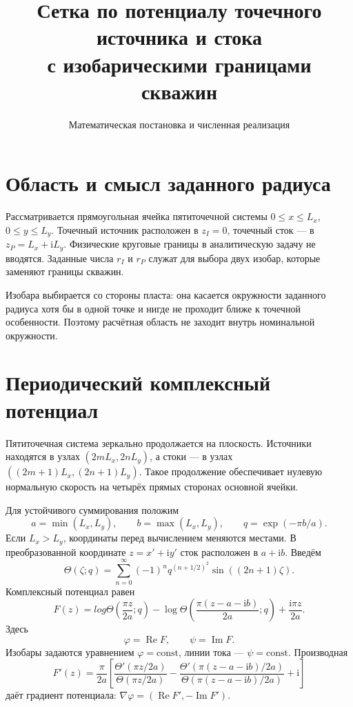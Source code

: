 \documentclass[12pt,a4paper]{article}
\title{Сетка по потенциалу точечного источника и стока\\
с изобарическими границами скважин}
\author{Математическая постановка и численная реализация}
\date{}
\begin{document}
\maketitle

\section{Область и смысл заданного радиуса}

Рассматривается прямоугольная ячейка пятиточечной системы
$0\le x\le L_x$, $0\le y\le L_y$. Точечный источник расположен в
$z_I=0$, точечный сток --- в $z_P=L_x+\mathrm iL_y$. Физические круговые
границы в аналитическую задачу не вводятся. Заданные числа $r_I$ и $r_P$
служат для выбора двух изобар, которые заменяют границы скважин.

Изобара выбирается со стороны пласта: она касается окружности заданного
радиуса хотя бы в одной точке и нигде не проходит ближе к точечной
особенности. Поэтому расчётная область не заходит внутрь номинальной
окружности.

\section{Периодический комплексный потенциал}

Пятиточечная система зеркально продолжается на плоскость. Источники находятся
в узлах $(2mL_x,2nL_y)$, а стоки --- в узлах
$((2m+1)L_x,(2n+1)L_y)$. Такое продолжение обеспечивает нулевую нормальную
скорость на четырёх прямых сторонах основной ячейки.

Для устойчивого суммирования положим
\[
 a=\min(L_x,L_y),\qquad b=\max(L_x,L_y),\qquad
 q=\exp(-\pi b/a).
\]
Если $L_x>L_y$, координаты перед вычислением меняются местами. В преобразованной
координате $z=x'+\mathrm iy'$ сток расположен в $a+\mathrm ib$. Введём
\[
 \Theta(\zeta;q)=\sum_{n=0}^{\infty}(-1)^n
 q^{(n+1/2)^2}\sin((2n+1)\zeta).
\]
Комплексный потенциал равен
\begin{equation}
 F(z)=log\Theta\!\left(\frac{\pi z}{2a};q\right)
 -\log\Theta\!\left(\frac{\pi(z-a-\mathrm ib)}{2a};q\right)
 +\frac{\mathrm i\pi z}{2a}.
 \label{eq:F}
\end{equation}
Здесь
\[
 \varphi=\operatorname{Re}F,\qquad
 \psi=\operatorname{Im}F.
\]
Изобары задаются уравнением $\varphi=\mathrm{const}$, линии тока ---
$\psi=\mathrm{const}$. Производная
\begin{equation}
 F'(z)=\frac{\pi}{2a}\left[
 \frac{\Theta'(\pi z/2a)}{\Theta(\pi z/2a)}-
 \frac{\Theta'(\pi(z-a-\mathrm ib)/2a)}
      {\Theta(\pi(z-a-\mathrm ib)/2a)}+\mathrm i
 \right]
 \label{eq:velocity}
\end{equation}
даёт градиент потенциала:
$\nabla\varphi=(\operatorname{Re}F',-\operatorname{Im}F')$.
\end{document}
